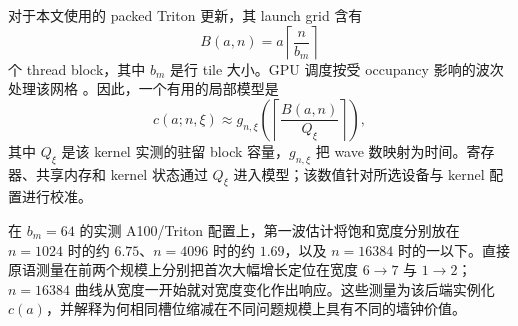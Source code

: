 对于本文使用的 packed Triton 更新，其 launch grid 含有
\begin{equation}
B(a,n)=a\left\lceil\frac{n}{b_m}\right\rceil
\label{eq:block-grid}
\end{equation}
个 thread block，其中 $b_m$ 是行 tile 大小。GPU 调度按受 occupancy 影响的波次处理该网格 \citep{yu2021habitat,nvidia2024cuda}。因此，一个有用的局部模型是
\begin{equation}
c(a;n,\xi)\approx g_{n,\xi}\!\left(\left\lceil\frac{B(a,n)}{Q_{\xi}}\right\rceil\right),
\label{eq:wave-cost}
\end{equation}
其中 $Q_{\xi}$ 是该 kernel 实测的驻留 block 容量，$g_{n,\xi}$ 把 wave 数映射为时间。寄存器、共享内存和 kernel 状态通过 $Q_{\xi}$ 进入模型；该数值针对所选设备与 kernel 配置进行校准。

在 $b_m=64$ 的实测 A100/Triton 配置上，第一波估计将饱和宽度分别放在 $n=1024$ 时的约 $6.75$、$n=4096$ 时的约 $1.69$，以及 $n=16384$ 时的一以下。直接原语测量在前两个规模上分别把首次大幅增长定位在宽度 $6\rightarrow7$ 与 $1\rightarrow2$；$n=16384$ 曲线从宽度一开始就对宽度变化作出响应。这些测量为该后端实例化 $c(a)$，并解释为何相同槽位缩减在不同问题规模上具有不同的墙钟价值。
